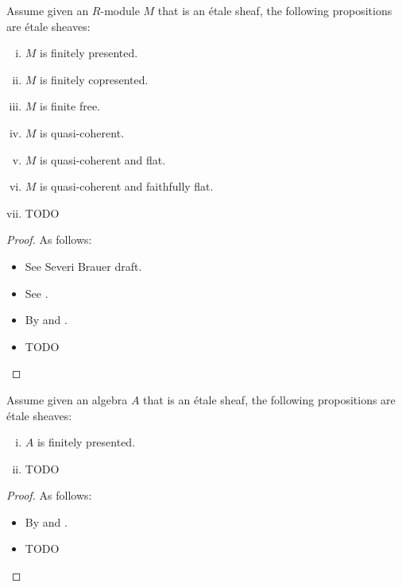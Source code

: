 \begin{proposition}\label{module-all-descent}
Assume given an $R$-module $M$ that is an \'etale sheaf, the following propositions are \'etale sheaves:
\begin{enumerate}[(i)]
\item $M$ is finitely presented.
\item $M$ is finitely copresented.
\item $M$ is finite free.
\item $M$ is quasi-coherent.
\item $M$ is quasi-coherent and flat. 
\item $M$ is quasi-coherent and faithfully flat. 
\item TODO
\end{enumerate}
\end{proposition}

\begin{proof}
As follows:
\begin{itemize}
\item[(i,ii,iii)] See Severi Brauer draft.
\item[(iv)] See .
\item[(v,vi)] By  and .
\item TODO
\end{itemize}
\end{proof}

\begin{proposition}\label{algebra-all-descent}
Assume given an algebra $A$ that is an \'etale sheaf, the following propositions are \'etale sheaves:
\begin{enumerate}[(i)]
\item $A$ is finitely presented.
\item TODO
\end{enumerate}
\end{proposition}

\begin{proof}
As follows:
\begin{itemize}
\item[(i)] By  and .
\item TODO
\end{itemize}
\end{proof}

